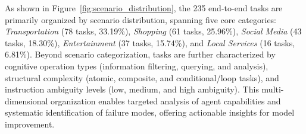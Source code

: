 As shown in Figure~\ref{fig:scenario_distribution}, the 235 end-to-end tasks are primarily organized by scenario distribution, spanning five core categories: \textit{Transportation} (78 tasks, 33.19\%), \textit{Shopping} (61 tasks, 25.96\%), \textit{Social Media} (43 tasks, 18.30\%), \textit{Entertainment} (37 tasks, 15.74\%), and \textit{Local Services} (16 tasks, 6.81\%). Beyond scenario categorization, tasks are further characterized by cognitive operation types (information filtering, querying, and analysis), structural complexity (atomic, composite, and conditional/loop tasks), and instruction ambiguity levels (low, medium, and high ambiguity). This multi-dimensional organization enables targeted analysis of agent capabilities and systematic identification of failure modes, offering actionable insights for model improvement.


